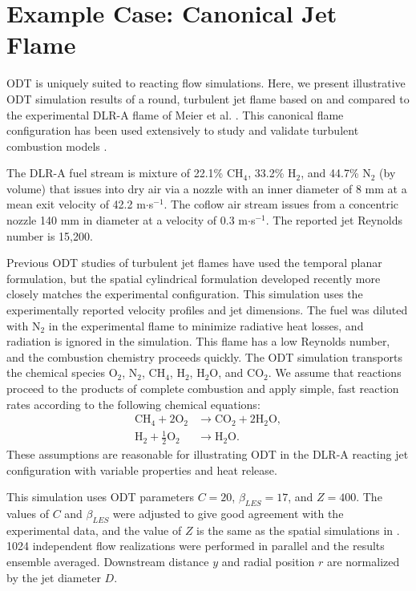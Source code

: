 \documentclass[preprint,12pt, a4paper]{elsarticle}
\begin{document}

\section{Example Case: Canonical Jet Flame}
\label{sec:examples}

ODT is uniquely suited to reacting flow simulations. Here, we present illustrative ODT simulation results of a round, turbulent jet flame based on and compared to the experimental DLR-A flame of Meier et al. \cite{Meier_2000}. This canonical flame configuration has been used extensively to study and validate turbulent combustion models \cite{Pitsch_2000,Lindstedt_2005,Wang_2011,Fairweather_2004,Lee_2008,Lee_2009}. 

The DLR-A fuel stream is mixture of 22.1\% CH$_4$, 33.2\% H$_2$, and 44.7\% N$_2$ (by volume) that issues into dry air via a nozzle with an inner diameter of 8 mm at a mean exit velocity of 42.2 m$\cdot$s$^{-1}$. The coflow air stream issues from a concentric nozzle 140 mm in diameter at a velocity of 0.3 m$\cdot$s$^{-1}$. The reported jet Reynolds number is 15,200.

Previous ODT studies of turbulent jet flames have used the temporal planar formulation, but the spatial cylindrical formulation developed recently \cite{Lignell_2018} more closely matches the experimental configuration. This simulation uses the experimentally reported velocity profiles and jet dimensions.  
The fuel was diluted with N$_2$ in the experimental flame to minimize radiative heat losses, and radiation is ignored in the simulation. This flame has a low Reynolds number, and the combustion chemistry proceeds quickly. The ODT simulation transports the chemical species O$_2$, N$_2$, CH$_4$, H$_2$, H$_2$O, and CO$_2$. We assume that reactions proceed to the products of complete combustion and apply simple, fast reaction rates according to the following chemical equations:
\begin{align}
	\mathrm{CH}_4 + 2\mathrm{O}_2 & \rightarrow \mathrm{CO}_2 + 2\mathrm{H}_2\mathrm{O}, \\
	\mathrm{H}_2+\frac{1}{2}\mathrm{O}_2 & \rightarrow \mathrm{H}_2\mathrm{O}.
\end{align}
These assumptions are reasonable for illustrating ODT in the DLR-A reacting jet configuration with variable properties and heat release. 

This simulation uses ODT parameters $C=20$, $\beta_{LES}=17$, and $Z=400$. The values of $C$ and $\beta_{LES}$ were adjusted to give good agreement with the experimental data, and the value of $Z$ is the same as the spatial simulations in \cite{Monson_2016}. 1024 independent flow realizations were performed in parallel and the results ensemble averaged. Downstream distance $y$ and radial position $r$ are normalized by the jet diameter $D$.
\end{document}
